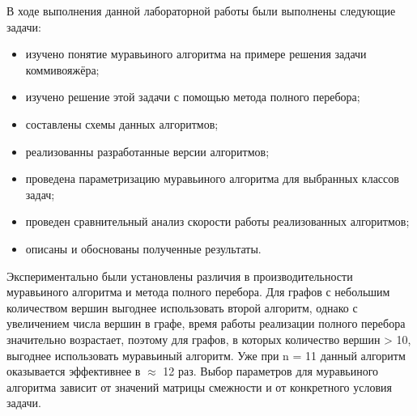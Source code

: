
В ходе выполнения данной лабораторной работы были выполнены следующие задачи:
\begin{itemize}
	\item изучено понятие муравьиного алгоритма на примере решения задачи коммивояжёра;
	\item изучено решение этой задачи с помощью метода полного перебора;
	\item составлены схемы данных алгоритмов;
	\item реализованны разработанные версии алгоритмов;
	\item проведена параметризацию муравьиного алгоритма для выбранных классов задач;
	\item проведен сравнительный анализ скорости работы реализованных алгоритмов;
	\item описаны и обоснованы полученные результаты.
\end{itemize}

Экспериментально были установлены различия в производительности муравьиного алгоритма и метода полного перебора. Для графов с небольшим количеством вершин выгоднее использовать второй алгоритм, однако с увеличением числа вершин в графе, время работы реализации полного перебора значительно возрастает, поэтому для графов, в которых количество вершин > 10, выгоднее использовать муравьиный алгоритм. Уже при n = 11 данный алгоритм оказывается эффективнее в $\approx$ 12 раз. Выбор параметров для муравьиного
алгоритма зависит от значений матрицы смежности и от конкретного условия задачи.